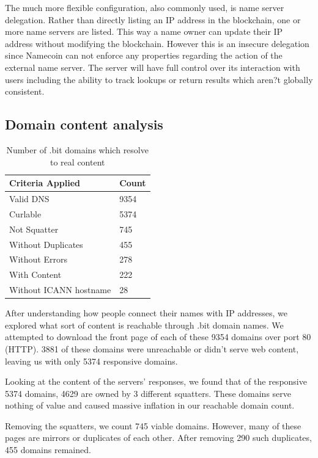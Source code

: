 The much more flexible configuration, also commonly used, is name server delegation. Rather than directly listing an IP address in the blockchain, one or more name servers are listed. This way a name owner can update their IP address without modifying the blockchain. However this is an insecure delegation since Namecoin can not enforce any properties regarding the action of the external name server. The server will have full control over its interaction with users including the ability to track lookups or return results which aren?t globally consistent.

\subsection{Domain content analysis}
\label{domainbreakdown}

\begin{table}[t]
\centering
\begin{tabular}{ll}
Criteria Applied & Count \\ \hline
Valid DNS          &  9354  \\
Curlable        & 5374     \\
Not Squatter        & 745     \\
Without Duplicates      & 455     \\
Without Errors              & 278    \\
With Content              & 222    \\
Without ICANN hostname   & 28   \\
\end{tabular}
\caption{Number of .bit domains which resolve to real content}
\end{table}

After understanding how people connect their names with IP addresses, we explored what sort of content is reachable through .bit domain names. We attempted to download the front page of each of these 9354 domains over port 80 (HTTP). 3881 of these domains were unreachable or didn't serve web content, leaving us with only 5374 responsive domains.

Looking at the content of the servers' responses, we found that of the responsive 5374 domains, 4629 are owned by 3 different squatters. These domains serve nothing of value and caused massive inflation in our reachable domain count.

Removing the squatters, we count 745 viable domains. However, many of these pages are mirrors or duplicates of each other. After removing 290 such duplicates, 455 domains remained.


